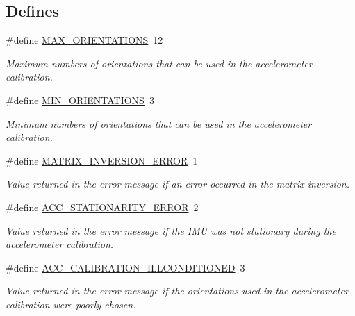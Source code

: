 \subsection*{\-Defines}
\begin{DoxyCompactItemize}
\item 
\#define \hyperlink{group__nav__eq_gac33a980808c64969262d91fa090eae7d}{\-M\-A\-X\-\_\-\-O\-R\-I\-E\-N\-T\-A\-T\-I\-O\-N\-S}~12
\begin{DoxyCompactList}\small\item\em \-Maximum numbers of orientations that can be used in the accelerometer calibration. \end{DoxyCompactList}\item 
\#define \hyperlink{group__nav__eq_ga4a21daf1ec76403dafe6b89d46fedbce}{\-M\-I\-N\-\_\-\-O\-R\-I\-E\-N\-T\-A\-T\-I\-O\-N\-S}~3
\begin{DoxyCompactList}\small\item\em \-Minimum numbers of orientations that can be used in the accelerometer calibration. \end{DoxyCompactList}\item 
\#define \hyperlink{group__nav__eq_ga2543e63d374d215bd7e64b4afb54287f}{\-M\-A\-T\-R\-I\-X\-\_\-\-I\-N\-V\-E\-R\-S\-I\-O\-N\-\_\-\-E\-R\-R\-O\-R}~1
\begin{DoxyCompactList}\small\item\em \-Value returned in the error message if an error occurred in the matrix inversion. \end{DoxyCompactList}\item 
\#define \hyperlink{group__nav__eq_gad356bf235d99e4983077623c35c068c0}{\-A\-C\-C\-\_\-\-S\-T\-A\-T\-I\-O\-N\-A\-R\-I\-T\-Y\-\_\-\-E\-R\-R\-O\-R}~2
\begin{DoxyCompactList}\small\item\em \-Value returned in the error message if the \-I\-M\-U was not stationary during the accelerometer calibration. \end{DoxyCompactList}\item 
\#define \hyperlink{group__nav__eq_ga831d1c30dc8456f94b32e61f65409f4d}{\-A\-C\-C\-\_\-\-C\-A\-L\-I\-B\-R\-A\-T\-I\-O\-N\-\_\-\-I\-L\-L\-C\-O\-N\-D\-I\-T\-I\-O\-N\-E\-D}~3
\begin{DoxyCompactList}\small\item\em \-Value returned in the error message if the orientations used in the accelerometer calibration were poorly chosen. \end{DoxyCompactList}\item 

\end{DoxyCompactItemize}
